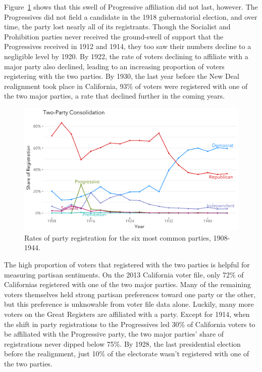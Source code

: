 \documentclass[11pt]{scrartcl}\usepackage[]{graphicx}\usepackage[]{color}
\makeatletter
\def\maxwidth{ %
  \ifdim\Gin@nat@width>\linewidth
    \linewidth
  \else
    \Gin@nat@width
  \fi
}
\newenvironment{knitrout}{}{} %
\makeatother
\begin{document}
Figure~\ref{fig:consolidation} shows that this swell of Progressive affiliation did not last, however.  The Progressives did not field a candidate in the 1918 gubernatorial election, and over time, the party lost nearly all of its registrants.  Though the Socialist and Prohibition parties never received the ground-swell of support that the Progressives received in 1912 and 1914, they too saw their numbers decline to a negligible level by 1920.  By 1922, the rate of voters declining to affiliate with a major party also declined, leading to an increasing proportion of voters registering with the two parties.  By 1930, the last year before the New Deal realignment took place in California, 93\% of voters were registered with one of the two major parties, a rate that declined further in the coming years.

\begin{knitrout}
\color{fgcolor}\begin{figure}

{\centering \includegraphics[width=\maxwidth]{figures/plots-consolidation-1} 

}

\caption[Rates of party registration for the six most common parties, 1908-1944]{Rates of party registration for the six most common parties, 1908-1944.}\label{fig:consolidation}
\end{figure}


\end{knitrout}

The high proportion of voters that registered with the two parties is helpful for measuring partisan sentiments.  On the 2013 California voter file, only 72\% of Californias registered with one of the two major parties. Many of the remaining voters themselves held strong partisan preferences toward one party or the other, but this preference is unknowable from voter file data alone. Luckily, many more voters on the Great Registers are affiliated with a party.  Except for 1914, when the shift in party registrations to the Progressives led 30\% of California voters to be affiliated with the Progressive party, the two major parties' share of registrations never dipped below 75\%.  By 1928, the last presidential election before the realignment, just 10\% of the electorate wasn't registered with one of the two parties.
\end{document}
